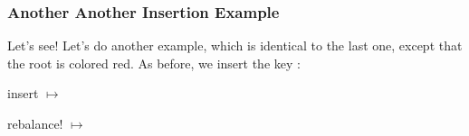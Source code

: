 \documentclass[aspectratio=169]{beamer}
\begin{document}
\begin{frame}
  \frametitle{Another Another Insertion Example}

  Let's see! Let's do another example, which is identical to the last one, except
  that the root is colored red. As before, we insert the key :

  \pause
  \vspace{\fill}

  \begin{center}
    \begin{minipage}{0.25\textwidth}
      \begin{adjustbox}{center}
      \end{adjustbox}
    \end{minipage}
  \pause
    \begin{minipage}{0.10\textwidth}
      \begin{center}
        insert  $\mapsto$
      \end{center}
    \end{minipage}
    \begin{minipage}{0.25\textwidth}
        \begin{adjustbox}{center}
        \end{adjustbox}
    \end{minipage}
  \pause
    \begin{minipage}{0.10\textwidth}
      \begin{center}
        rebalance! $\mapsto$
      \end{center}
    \end{minipage}
    \begin{minipage}{0.25\textwidth}
        \begin{adjustbox}{center}
        \end{adjustbox}
    \end{minipage}
  \end{center}


\end{frame}
\end{document}

